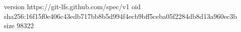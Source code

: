 version https://git-lfs.github.com/spec/v1
oid sha256:16f15f0e406c43edb717bb8b5d994f4ecb9bff5ceba05f2284db8d13a960ec3b
size 98322
